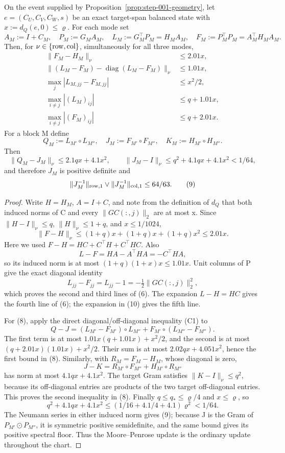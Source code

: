 \begin{lemma}\label{lem:step-011-gram-reserve}
On the event supplied by Proposition~\ref{prop:step-001-geometry}, let
\(e=(C_U,C_V,C_W,s)\) be an exact target-span balanced state with
\(x:=d_Q(e,0)\le\varrho\). For each mode set
\[
 A_M:=I+C_M,\quad P_M:=G_MA_M,\quad
 L_M:=G_M^\top P_M=H_MA_M,\quad
 F_M:=P_M^\top P_M=A_M^\top H_MA_M.
\tag{5}
\]
Then, for \(\nu\in\{{\rm row},{\rm col}\}\), simultaneously for all
three modes,
\[
\begin{aligned}
 \|F_M-H_M\|_\nu&\le2.01x,\\
 \|(L_M-F_M)-\operatorname{diag}(L_M-F_M)\|_\nu&\le1.01x,\\
 \max_j|L_{M,jj}-F_{M,jj}|&\le x^2/2,\\
 \max_{i\ne j}|(L_M)_{ij}|&\le q+1.01x,\\
 \max_{i\ne j}|(F_M)_{ij}|&\le q+2.01x.
\end{aligned}
\tag{6}
\]
For a block M define
\[
 Q_M:=L_{M'}\circ L_{M''},\quad
 J_M:=F_{M'}\circ F_{M''},\quad
 K_M:=H_{M'}\circ H_{M''}.
\tag{7}
\]
Then
\[
 \|Q_M-J_M\|_\nu\le2.1qx+4.1x^2,
 \qquad
 \|J_M-I\|_\nu\le q^2+4.1qx+4.1x^2<1/64,
\tag{8}
\]
and therefore \(J_M\) is positive definite and
\[
 \|J_M^{-1}\|_{\rm row,1}\vee\|J_M^{-1}\|_{\rm col,1}\le64/63.
\tag{9}
\]

\begin{proof}
Write \(H=H_M\), \(A=I+C\), and note from
the definition of \(d_Q\) that both induced norms of C and every
\(\|GC(:,j)\|_2\) are at most x. Since \(\|H-I\|_\nu\le q\),
\(\|H\|_\nu\le1+q\), and \(x\le1/1024\),
\[
 \|F-H\|_\nu
 \le (1+q)x+(1+q)x+(1+q)x^2\le2.01x.
\tag{10}
\]
Here we used \(F-H=HC+C^\top H+C^\top HC\). Also
\[
 L-F=HA-A^\top HA=-C^\top HA,
\tag{11}
\]
so its induced norm is at most \((1+q)(1+x)x\le1.01x\).
Unit columns of P give the exact diagonal identity
\[
 L_{jj}-F_{jj}=L_{jj}-1=-\tfrac12\|GC(:,j)\|_2^2,
\tag{12}
\]
which proves the second and third lines of (6). The expansion
\(L-H=HC\) gives the fourth line of (6); the expansion in (10) gives the
fifth line.

For (8), apply the direct diagonal/off-diagonal inequality (C1) to
\[
 Q-J=(L_{M'}-F_{M'})\circ L_{M''}
   +F_{M'}\circ(L_{M''}-F_{M''}).
\tag{13}
\]
The first term is at most
\(1.01x(q+1.01x)+x^2/2\), and the second is at most
\((q+2.01x)(1.01x)+x^2/2\). Their sum is at most
\(2.02qx+4.051x^2\), hence the first bound in (8). Similarly, with
\(R_M=F_M-H_M\), whose diagonal is zero,
\[
 J-K=R_{M'}\circ F_{M''}+H_{M'}\circ R_{M''}
\tag{14}
\]
has norm at most \(4.1qx+4.1x^2\). The target Gram satisfies
\(\|K-I\|_\nu\le q^2\), because its off-diagonal entries are products of
the two target off-diagonal entries. This proves the second inequality in
(8). Finally \(q\le q_*\le\varrho/4\) and \(x\le\varrho\), so
\[
q^2+4.1qx+4.1x^2
\le(1/16+4.1/4+4.1)\varrho^2<1/64.
\tag{15}
\]
The Neumann series in either induced norm gives (9); because J is the Gram
of \(P_{M'}\odot P_{M''}\), it is symmetric positive semidefinite, and
the same bound gives its positive spectral floor. Thus the Moore--Penrose
update is the ordinary update throughout the chart.


\end{proof}
\end{lemma}
